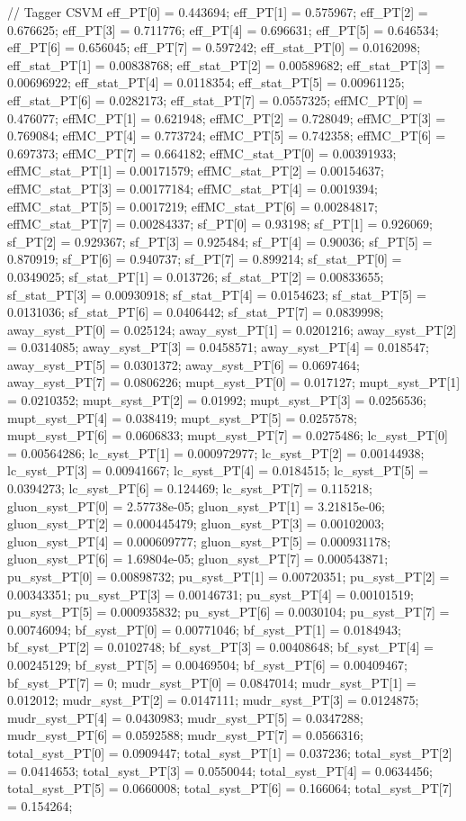 // Tagger CSVM
eff_PT[0] = 0.443694; eff_PT[1] = 0.575967; eff_PT[2] = 0.676625; 
eff_PT[3] = 0.711776; eff_PT[4] = 0.696631; eff_PT[5] = 0.646534; 
eff_PT[6] = 0.656045; eff_PT[7] = 0.597242; 
eff_stat_PT[0] = 0.0162098; eff_stat_PT[1] = 0.00838768; eff_stat_PT[2] = 0.00589682; 
eff_stat_PT[3] = 0.00696922; eff_stat_PT[4] = 0.0118354; eff_stat_PT[5] = 0.00961125; 
eff_stat_PT[6] = 0.0282173; eff_stat_PT[7] = 0.0557325; 
effMC_PT[0] = 0.476077; effMC_PT[1] = 0.621948; effMC_PT[2] = 0.728049; 
effMC_PT[3] = 0.769084; effMC_PT[4] = 0.773724; effMC_PT[5] = 0.742358; 
effMC_PT[6] = 0.697373; effMC_PT[7] = 0.664182; 
effMC_stat_PT[0] = 0.00391933; effMC_stat_PT[1] = 0.00171579; effMC_stat_PT[2] = 0.00154637; 
effMC_stat_PT[3] = 0.00177184; effMC_stat_PT[4] = 0.0019394; effMC_stat_PT[5] = 0.0017219; 
effMC_stat_PT[6] = 0.00284817; effMC_stat_PT[7] = 0.00284337; 
sf_PT[0] = 0.93198; sf_PT[1] = 0.926069; sf_PT[2] = 0.929367; 
sf_PT[3] = 0.925484; sf_PT[4] = 0.90036; sf_PT[5] = 0.870919; 
sf_PT[6] = 0.940737; sf_PT[7] = 0.899214; 
sf_stat_PT[0] = 0.0349025; sf_stat_PT[1] = 0.013726; sf_stat_PT[2] = 0.00833655; 
sf_stat_PT[3] = 0.00930918; sf_stat_PT[4] = 0.0154623; sf_stat_PT[5] = 0.0131036; 
sf_stat_PT[6] = 0.0406442; sf_stat_PT[7] = 0.0839998; 
away_syst_PT[0] = 0.025124; away_syst_PT[1] = 0.0201216; away_syst_PT[2] = 0.0314085; 
away_syst_PT[3] = 0.0458571; away_syst_PT[4] = 0.018547; away_syst_PT[5] = 0.0301372; 
away_syst_PT[6] = 0.0697464; away_syst_PT[7] = 0.0806226; 
mupt_syst_PT[0] = 0.017127; mupt_syst_PT[1] = 0.0210352; mupt_syst_PT[2] = 0.01992; 
mupt_syst_PT[3] = 0.0256536; mupt_syst_PT[4] = 0.038419; mupt_syst_PT[5] = 0.0257578; 
mupt_syst_PT[6] = 0.0606833; mupt_syst_PT[7] = 0.0275486; 
lc_syst_PT[0] = 0.00564286; lc_syst_PT[1] = 0.000972977; lc_syst_PT[2] = 0.00144938; 
lc_syst_PT[3] = 0.00941667; lc_syst_PT[4] = 0.0184515; lc_syst_PT[5] = 0.0394273; 
lc_syst_PT[6] = 0.124469; lc_syst_PT[7] = 0.115218; 
gluon_syst_PT[0] = 2.57738e-05; gluon_syst_PT[1] = 3.21815e-06; gluon_syst_PT[2] = 0.000445479; 
gluon_syst_PT[3] = 0.00102003; gluon_syst_PT[4] = 0.000609777; gluon_syst_PT[5] = 0.000931178; 
gluon_syst_PT[6] = 1.69804e-05; gluon_syst_PT[7] = 0.000543871; 
pu_syst_PT[0] = 0.00898732; pu_syst_PT[1] = 0.00720351; pu_syst_PT[2] = 0.00343351; 
pu_syst_PT[3] = 0.00146731; pu_syst_PT[4] = 0.00101519; pu_syst_PT[5] = 0.000935832; 
pu_syst_PT[6] = 0.0030104; pu_syst_PT[7] = 0.00746094; 
bf_syst_PT[0] = 0.00771046; bf_syst_PT[1] = 0.0184943; bf_syst_PT[2] = 0.0102748; 
bf_syst_PT[3] = 0.00408648; bf_syst_PT[4] = 0.00245129; bf_syst_PT[5] = 0.00469504; 
bf_syst_PT[6] = 0.00409467; bf_syst_PT[7] = 0; 
mudr_syst_PT[0] = 0.0847014; mudr_syst_PT[1] = 0.012012; mudr_syst_PT[2] = 0.0147111; 
mudr_syst_PT[3] = 0.0124875; mudr_syst_PT[4] = 0.0430983; mudr_syst_PT[5] = 0.0347288; 
mudr_syst_PT[6] = 0.0592588; mudr_syst_PT[7] = 0.0566316; 
total_syst_PT[0] = 0.0909447; total_syst_PT[1] = 0.037236; total_syst_PT[2] = 0.0414653; 
total_syst_PT[3] = 0.0550044; total_syst_PT[4] = 0.0634456; total_syst_PT[5] = 0.0660008; 
total_syst_PT[6] = 0.166064; total_syst_PT[7] = 0.154264; 



